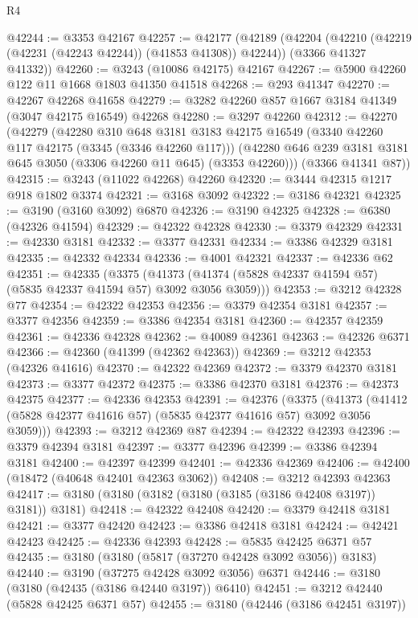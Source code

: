 \begin{lexlean}{R4}
\begin{coremodule}
@42244 := @3353 @42167
@42257 := @42177
    (@42189
      (@42204 (@42210 (@42219 (@42231 (@42243 @42244)) (@41853 @41308)) @42244))
      (@3366 @41327 @41332))
@42260 := @3243 (@10086 @42175) @42167
@42267 := @5900 @42260 @122 @11 @1668 @1803 @41350 @41518
@42268 := @293 @41347
@42270 := @42267 @42268 @41658
@42279 := @3282 @42260 @857 @1667 @3184 @41349 (@3047 @42175 @16549) @42268
@42280 := @3297 @42260
@42312 := @42270
    (@42279
      (@42280
        @310
        @648
        @3181
        @3183
        @42175
        @16549
        (@3340 @42260 @117 @42175 (@3345 (@3346 @42260 @117)))
        (@42280 @646 @239 @3181 @3181 @645 @3050 (@3306 @42260 @11 @645) (@3353 @42260)))
      (@3366 @41341 @87))
@42315 := @3243 (@11022 @42268) @42260
@42320 := @3444 @42315 @1217 @918 @1802 @3374
@42321 := @3168 @3092
@42322 := @3186 @42321
@42325 := @3190 (@3160 @3092) @6870
@42326 := @3190 @42325
@42328 := @6380 (@42326 @41594)
@42329 := @42322 @42328
@42330 := @3379 @42329
@42331 := @42330 @3181
@42332 := @3377 @42331
@42334 := @3386 @42329 @3181
@42335 := @42332 @42334
@42336 := @4001 @42321
@42337 := @42336 @62
@42351 := @42335
    (@3375 (@41373 (@41374 (@5828 @42337 @41594 @57) (@5835 @42337 @41594 @57) @3092 @3056 @3059)))
@42353 := @3212 @42328 @77
@42354 := @42322 @42353
@42356 := @3379 @42354 @3181
@42357 := @3377 @42356
@42359 := @3386 @42354 @3181
@42360 := @42357 @42359
@42361 := @42336 @42328
@42362 := @40089 @42361
@42363 := @42326 @6371
@42366 := @42360 (@41399 (@42362 @42363))
@42369 := @3212 @42353 (@42326 @41616)
@42370 := @42322 @42369
@42372 := @3379 @42370 @3181
@42373 := @3377 @42372
@42375 := @3386 @42370 @3181
@42376 := @42373 @42375
@42377 := @42336 @42353
@42391 := @42376
    (@3375 (@41373 (@41412 (@5828 @42377 @41616 @57) (@5835 @42377 @41616 @57) @3092 @3056 @3059)))
@42393 := @3212 @42369 @87
@42394 := @42322 @42393
@42396 := @3379 @42394 @3181
@42397 := @3377 @42396
@42399 := @3386 @42394 @3181
@42400 := @42397 @42399
@42401 := @42336 @42369
@42406 := @42400 (@18472 (@40648 @42401 @42363 @3062))
@42408 := @3212 @42393 @42363
@42417 := @3180 (@3180 (@3182 (@3180 (@3185 (@3186 @42408 @3197)) @3181)) @3181)
@42418 := @42322 @42408
@42420 := @3379 @42418 @3181
@42421 := @3377 @42420
@42423 := @3386 @42418 @3181
@42424 := @42421 @42423
@42425 := @42336 @42393
@42428 := @5835 @42425 @6371 @57
@42435 := @3180 (@3180 (@5817 (@37270 @42428 @3092 @3056)) @3183)
@42440 := @3190 (@37275 @42428 @3092 @3056) @6371
@42446 := @3180 (@3180 (@42435 (@3186 @42440 @3197)) @6410)
@42451 := @3212 @42440 (@5828 @42425 @6371 @57)
@42455 := @3180 (@42446 (@3186 @42451 @3197))

\end{coremodule}
\end{lexlean}
